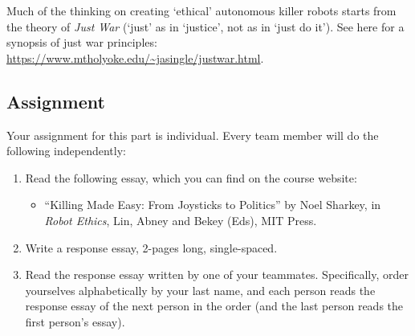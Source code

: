 \documentclass[letta4 paper]{article}
\numberwithin{equation}{section}
\newcommand{\0}{\mathbf{0}}
\begin{document}
	Much of the thinking on creating `ethical' autonomous killer robots starts from the theory of \textit{Just War} (`just' as in `justice', not as in `just do it').
	See here for a synopsis of just war principles: \url{https://www.mtholyoke.edu/~jasingle/justwar.html}.
	
	\subsection{Assignment}
	Your assignment for this part is individual. 
	Every team member will do the following independently: 
	\begin{enumerate}
		\item Read the following essay, which you can find on the course website:
		\begin{itemize}
			\item ``Killing Made Easy: From Joysticks to Politics'' by Noel Sharkey, in \textit{Robot Ethics}, Lin, Abney and Bekey (Eds), MIT Press.
		\end{itemize}
		
		\item Write a response essay, 2-pages long, single-spaced. 
		
		\item Read the response essay written by one of your teammates. Specifically, order yourselves alphabetically by your last name, and each person reads the response essay of the next person in the order (and the last person reads the first person's essay).
	\end{enumerate}
	
\end{document}
